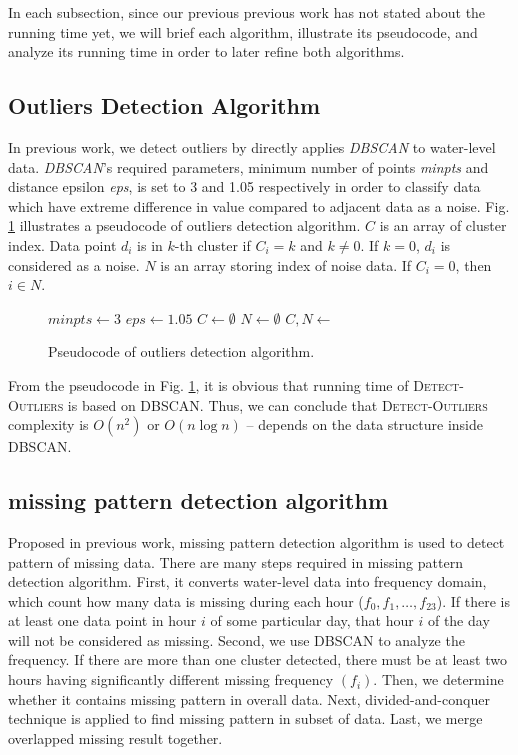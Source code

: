 \documentclass[conference]{IEEEtran}
\begin{document}
In each subsection, since our previous previous work has not stated about the running time yet, we will brief each algorithm, illustrate its pseudocode, and analyze its running time in order to later refine both algorithms.

\subsection{Outliers Detection Algorithm}
In previous work, we detect outliers by directly applies \textit{DBSCAN} to water-level data. \textit{DBSCAN}'s required parameters, minimum number of points \textit{minpts} and distance epsilon \textit{eps}, is set to 3 and 1.05 respectively in order to classify data which have extreme difference in value compared to adjacent data as a noise. Fig. \ref{fig:outliers_pseudocode} illustrates a pseudocode of outliers detection algorithm. $C$ is an array of cluster index. Data point $d_{i}$ is in $k$-th cluster if $C_{i} = k$ and $k \neq 0$. If $k = 0$, $d_{i}$ is considered as a noise. $N$ is an array storing index of noise data. If $C_{i} = 0$, then $i \in N$.

\begin{figure}
\begin{algorithmic}[1]
\State $minpts\gets3$
\State $eps\gets1.05 $
\State $C\gets\emptyset$
\State $N\gets\emptyset$
\State $C, N \gets $
\State {}
\EndProcedure
\end{algorithmic}
\caption{Pseudocode of outliers detection algorithm.}
\label{fig:outliers_pseudocode}
\end{figure}

From the pseudocode in Fig. \ref{fig:outliers_pseudocode}, it is obvious that running time of \textsc{Detect-Outliers} is based on \textsc{DBSCAN}. Thus, we can conclude that \textsc{Detect-Outliers} complexity is $O(n^2)$ or $O(n\log{n})$ -- depends on the data structure inside \textsc{DBSCAN}.

\subsection{missing pattern detection algorithm}

Proposed in previous work, missing pattern detection algorithm is used to detect pattern of missing data. There are many steps required in missing pattern detection algorithm. First, it converts water-level data into frequency domain, which count how many data is missing during each hour ($f_{0} ,f_{1}, \ldots, f_{23}$). If there is at least one data point in hour $i$ of some particular day, that hour $i$ of the day will not be considered as missing. Second, we use DBSCAN to analyze the frequency. If there are more than one cluster detected, there must be at least two hours having significantly different missing frequency $(f_{i})$. Then, we determine whether it contains missing pattern in overall data. Next, divided-and-conquer technique is applied to find missing pattern in subset of data. Last, we merge overlapped missing result together.
\end{document}
